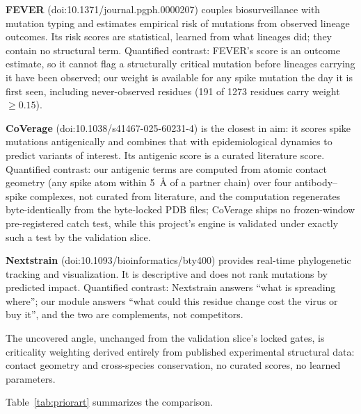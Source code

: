 \documentclass[11pt]{article}
\begin{document}
\textbf{FEVER} (doi:10.1371/journal.pgph.0000207) couples biosurveillance with mutation typing and estimates empirical risk of mutations from observed lineage outcomes. Its risk scores are statistical, learned from what lineages did; they contain no structural term. Quantified contrast: FEVER's score is an outcome estimate, so it cannot flag a structurally critical mutation before lineages carrying it have been observed; our weight is available for any spike mutation the day it is first seen, including never-observed residues (191 of 1273 residues carry weight $\geq 0.15$).

\textbf{CoVerage} (doi:10.1038/s41467-025-60231-4) is the closest in aim: it scores spike mutations antigenically and combines that with epidemiological dynamics to predict variants of interest. Its antigenic score is a curated literature score. Quantified contrast: our antigenic terms are computed from atomic contact geometry (any spike atom within 5~\AA{} of a partner chain) over four antibody--spike complexes, not curated from literature, and the computation regenerates byte-identically from the byte-locked PDB files; CoVerage ships no frozen-window pre-registered catch test, while this project's engine is validated under exactly such a test by the validation slice.

\textbf{Nextstrain} (doi:10.1093/bioinformatics/bty400) provides real-time phylogenetic tracking and visualization. It is descriptive and does not rank mutations by predicted impact. Quantified contrast: Nextstrain answers ``what is spreading where''; our module answers ``what could this residue change cost the virus or buy it'', and the two are complements, not competitors.

The uncovered angle, unchanged from the validation slice's locked gates, is criticality weighting derived entirely from published experimental structural data: contact geometry and cross-species conservation, no curated scores, no learned parameters.

Table~\ref{tab:priorart} summarizes the comparison.

{\small}
\end{document}
